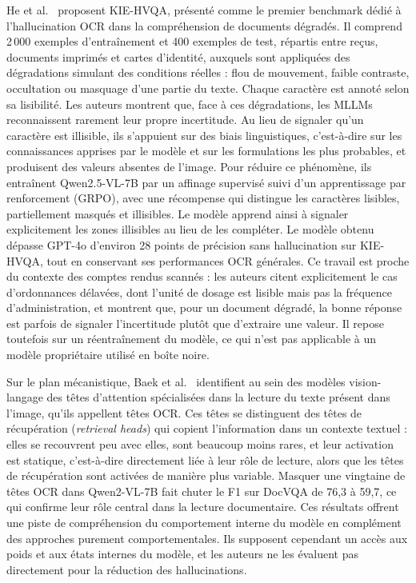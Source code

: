 He et al.~\cite{he2025seeing} proposent KIE-HVQA, présenté comme le premier benchmark dédié à l'hallucination OCR dans la compréhension de documents dégradés. Il comprend 2\,000 exemples d'entraînement et 400 exemples de test, répartis entre reçus, documents imprimés et cartes d'identité, auxquels sont appliquées des dégradations simulant des conditions réelles : flou de mouvement, faible contraste, occultation ou masquage d'une partie du texte. Chaque caractère est annoté selon sa lisibilité. Les auteurs montrent que, face à ces dégradations, les MLLMs reconnaissent rarement leur propre incertitude. Au lieu de signaler qu'un caractère est illisible, ils s'appuient sur des biais linguistiques, c'est-à-dire sur les connaissances apprises par le modèle et sur les formulations les plus probables, et produisent des valeurs absentes de l'image. Pour réduire ce phénomène, ils entraînent Qwen2.5-VL-7B par un affinage supervisé suivi d'un apprentissage par renforcement (GRPO), avec une récompense qui distingue les caractères lisibles, partiellement masqués et illisibles. Le modèle apprend ainsi à signaler explicitement les zones illisibles au lieu de les compléter. Le modèle obtenu dépasse GPT-4o d'environ 28 points de précision sans hallucination sur KIE-HVQA, tout en conservant ses performances OCR générales. Ce travail est proche du contexte des comptes rendus scannés : les auteurs citent explicitement le cas d'ordonnances délavées, dont l'unité de dosage est lisible mais pas la fréquence d'administration, et montrent que, pour un document dégradé, la bonne réponse est parfois de signaler l'incertitude plutôt que d'extraire une valeur. Il repose toutefois sur un réentraînement du modèle, ce qui n'est pas applicable à un modèle propriétaire utilisé en boîte noire.

Sur le plan mécanistique, Baek et al.~\cite{baek2025ocrheads} identifient au sein des modèles vision-langage des têtes d'attention spécialisées dans la lecture du texte présent dans l'image, qu'ils appellent têtes OCR. Ces têtes se distinguent des têtes de récupération (\textit{retrieval heads}) qui copient l'information dans un contexte textuel : elles se recouvrent peu avec elles, sont beaucoup moins rares, et leur activation est statique, c'est-à-dire directement liée à leur rôle de lecture, alors que les têtes de récupération sont activées de manière plus variable. Masquer une vingtaine de têtes OCR dans Qwen2-VL-7B fait chuter le F1 sur DocVQA de 76,3 à 59,7, ce qui confirme leur rôle central dans la lecture documentaire. Ces résultats offrent une piste de compréhension du comportement interne du modèle en complément des approches purement comportementales. Ils supposent cependant un accès aux poids et aux états internes du modèle, et les auteurs ne les évaluent pas directement pour la réduction des hallucinations.


